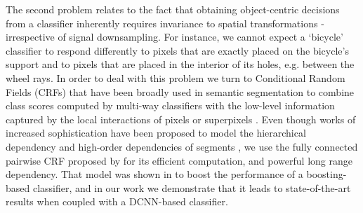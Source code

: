 The second problem relates to the fact that obtaining object-centric decisions from a classifier inherently requires invariance to spatial transformations - irrespective of signal downsampling. For instance, we cannot expect a `bicycle' classifier to respond differently to pixels that are exactly placed on the bicycle's support and to pixels that are placed in the interior of its holes, e.g. between the  wheel rays. In order to deal with this problem we turn to  Conditional Random Fields (CRFs) that have been broadly used in semantic segmentation to combine class scores computed by multi-way classifiers with the low-level information captured by the local interactions of pixels \citep{rother2004grabcut, shotton2009textonboost} or superpixels \citep{lucchi2011spatial}. Even though works of increased sophistication have been proposed 
 to model the hierarchical dependency \citep{he2004multiscale, ladicky2009associative, lempitsky2011pylon} and  high-order dependencies of segments \citep{delong2012fast, gonfaus2010harmony, kohli2009robust, krahenbuhl2011efficient}, we use the  fully connected pairwise CRF proposed by \citet{krahenbuhl2011efficient} for its efficient computation, and powerful long range dependency. That model was shown in  \citet{krahenbuhl2011efficient} to boost the performance of a boosting-based classifier, and in our work we demonstrate that it leads to state-of-the-art results when coupled with a DCNN-based classifier. 


